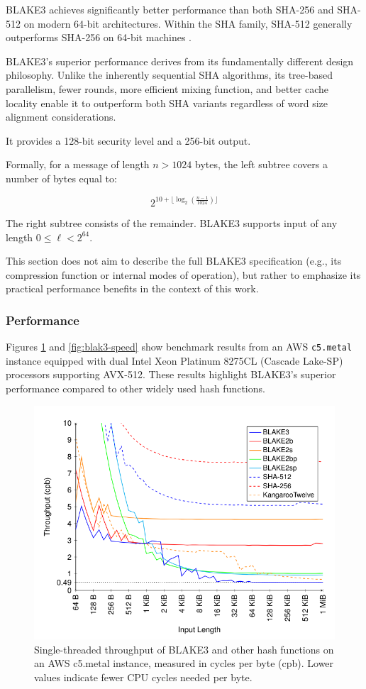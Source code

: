 BLAKE3 achieves significantly better performance than both SHA-256 and SHA-512 on modern 64-bit architectures. Within the SHA family, SHA-512 generally outperforms SHA-256 on 64-bit machines \cite{gueron2011sha}. 

BLAKE3's superior performance derives from its fundamentally different design philosophy. Unlike the inherently sequential SHA algorithms, its tree-based parallelism, fewer rounds, more efficient mixing function, and better cache locality enable it to outperform both SHA variants regardless of word size alignment considerations.

It provides a 128-bit security level and a 256-bit output.

Formally, for a message of length $n > 1024$ bytes, the left subtree covers a number of bytes equal to:

\[
2^{10 + \lfloor \log_2{\left(\frac{n-1}{1024}\right)} \rfloor}
\]

The right subtree consists of the remainder. BLAKE3 supports input of any length $0 \leq \ell < 2^{64}$.

This section does not aim to describe the full BLAKE3 specification (e.g., its compression function or internal modes of operation), but rather to emphasize its practical performance benefits in the context of this work.

\subsubsection{Performance}

Figures \ref{fig:blake3-thoughput-example} and \ref{fig:blak3-speed} show benchmark results from an AWS \texttt{c5.metal} instance equipped with dual Intel Xeon Platinum 8275CL (Cascade Lake-SP) processors supporting AVX-512.  
These results highlight BLAKE3's superior performance compared to other widely used hash functions.

\begin{figure}
    \centering
    \includegraphics[width=0.7\linewidth]{assets/blake3-throughput-example.png}
    \caption{Single-threaded throughput of BLAKE3 and other hash functions on an AWS c5.metal
instance, measured in cycles per byte (cpb). Lower values indicate fewer CPU cycles needed per byte.}
    \label{fig:blake3-thoughput-example}
\end{figure}

